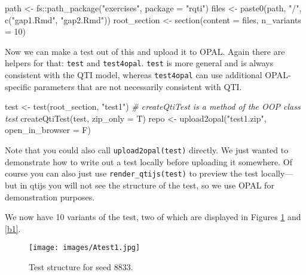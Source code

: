\documentclass[twoside]{tufte-book}
\newenvironment{Shaded}{}{}
\newcommand{\AttributeTok}[1]{\textcolor[rgb]{0.49,0.56,0.16}{#1}}
\newcommand{\CommentTok}[1]{\textcolor[rgb]{0.38,0.63,0.69}{\textit{#1}}}
\newcommand{\DecValTok}[1]{\textcolor[rgb]{0.25,0.63,0.44}{#1}}
\newcommand{\FunctionTok}[1]{\textcolor[rgb]{0.02,0.16,0.49}{#1}}
\newcommand{\NormalTok}[1]{#1}
\newcommand{\OtherTok}[1]{\textcolor[rgb]{0.00,0.44,0.13}{#1}}
\newcommand{\SpecialCharTok}[1]{\textcolor[rgb]{0.25,0.44,0.63}{#1}}
\newcommand{\StringTok}[1]{\textcolor[rgb]{0.25,0.44,0.63}{#1}}
\begin{document}
\begin{Shaded}
\begin{Highlighting}[]
\NormalTok{path }\OtherTok{\textless{}{-}}\NormalTok{ fs}\SpecialCharTok{::}\FunctionTok{path\_package}\NormalTok{(}\StringTok{"exercises"}\NormalTok{, }\AttributeTok{package =} \StringTok{"rqti"}\NormalTok{)}
\NormalTok{files }\OtherTok{\textless{}{-}} \FunctionTok{paste0}\NormalTok{(path, }\StringTok{"/"}\NormalTok{, }\FunctionTok{c}\NormalTok{(}\StringTok{"gap1.Rmd"}\NormalTok{, }\StringTok{"gap2.Rmd"}\NormalTok{))}
\NormalTok{root\_section }\OtherTok{\textless{}{-}} \FunctionTok{section}\NormalTok{(}\AttributeTok{content =}\NormalTok{ files, }\AttributeTok{n\_variants =} \DecValTok{10}\NormalTok{)}
\end{Highlighting}
\end{Shaded}

Now we can make a test out of this and upload it to OPAL. Again there are helpers for that: \texttt{test} and \texttt{test4opal}. \texttt{test} is more general and is always consistent with the QTI model, whereas \texttt{test4opal} can use additional OPAL-specific parameters that are not necessarily consistent with QTI.

\begin{Shaded}
\begin{Highlighting}[]
\NormalTok{test }\OtherTok{\textless{}{-}} \FunctionTok{test}\NormalTok{(root\_section, }\StringTok{"test1"}\NormalTok{)}
\CommentTok{\# createQtiTest is a method of the OOP class \textasciigrave{}test\textasciigrave{}}
\FunctionTok{createQtiTest}\NormalTok{(test, }\AttributeTok{zip\_only =}\NormalTok{ T)}
\NormalTok{repo }\OtherTok{\textless{}{-}} \FunctionTok{upload2opal}\NormalTok{(}\StringTok{"test1.zip"}\NormalTok{, }\AttributeTok{open\_in\_browser =}\NormalTok{ F)}
\end{Highlighting}
\end{Shaded}

Note that you could also call \texttt{upload2opal(test)} directly. We just wanted to demonstrate how to write out a test locally before uploading it somewhere. Of course you can also just use \texttt{render\_qtijs(test)} to preview the test locally--- but in qtijs you will not see the structure of the test, so we use OPAL for demonstration purposes.

We now have 10 variants of the test, two of which are displayed in Figures \ref{a1} and \ref{b1}.

\begin{figure}
\centering
\texttt{[image: images/Atest1.jpg]}
\caption{\label{a1}Test structure for seed 8833.}
\end{figure}
\end{document}
